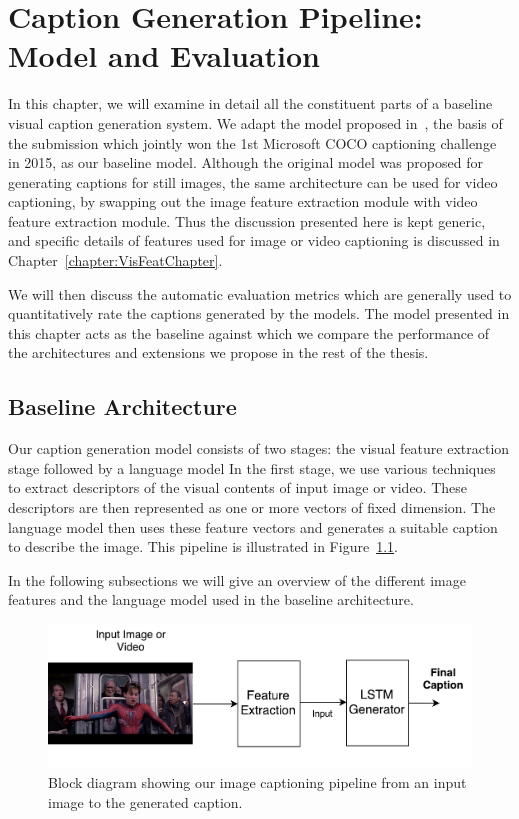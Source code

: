 \chapter{Caption Generation Pipeline: \\Model and Evaluation}
\label{chapter:baseline}
In this chapter, we will examine in detail all the constituent parts
of a baseline visual caption generation system.
We adapt the model proposed in~\cite{Vinyals_2015_CVPR}, the basis of the
submission which jointly won the 1st Microsoft COCO captioning challenge in
2015, as our baseline model.
Although the original model was proposed for generating captions for still
images, the same architecture can be used for video captioning, by
swapping out the image feature extraction module with video feature extraction
module.
Thus the discussion presented here is kept generic, and specific details of
features used for image or video captioning is discussed in
Chapter~\ref{chapter:VisFeatChapter}.

We will then discuss the automatic evaluation metrics which are generally used
to quantitatively rate the captions generated by the models. 
The model presented in this chapter acts as the baseline against which we
compare the performance of the architectures and extensions we propose in the
rest of the thesis.
\section{Baseline Architecture} 

Our caption generation model consists of two stages: the visual
feature extraction stage followed by a language model
In the first stage, we use various techniques to extract descriptors of
the visual contents of input image or video.
These descriptors are then represented as one or more vectors of fixed
dimension.
The language model then uses these feature vectors and generates a
suitable caption to describe the image.
This pipeline is illustrated in Figure~\ref{fig_fullModel}. 

In the following subsections we will give an overview of the different image
features and the language model used in the baseline architecture.

\begin{figure}[t]
  \begin{center}
      \includegraphics[width=0.8\linewidth]{images/Thesis_generalBaseline.pdf}
  \end{center}
  \vspace*{-8mm}
  \caption{Block diagram showing our image captioning pipeline from an
  input image to the generated caption.}
  \label{fig_fullModel}
\end{figure}

